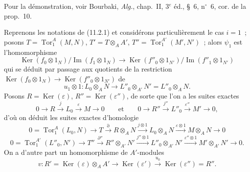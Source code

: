 Pour la démonstration, voir Bourbaki, \emph{Alg.}, chap.~II, 3$^e$ éd.,
\S~6, n$^\circ$~6, cor. de la prop.~10.

\begin{env}[11.2.3]
\label{IV.11.2.3-fr}
Reprenons les notations de (11.2.1) et considérons particulièrement le cas
$i=1$~; posons $T=\operatorname{Tor}_1^A(M,N)$, $T'=T\otimes_AA'$,
$T''=\operatorname{Tor}_1^{A'}(M',N')$~; alors $\psi_1$ est
l'homomorphisme
\[
\operatorname{Ker}(f_0\otimes1_N)/\operatorname{Im}(f_1\otimes1_N)
\to
\operatorname{Ker}(f''_0\otimes1_{N'})/
\operatorname{Im}(f''_1\otimes1_{N'})
\]
qui se déduit par passage aux quotients de la restriction
$\operatorname{Ker}(f_0\otimes1_N)\to
\operatorname{Ker}(f''_0\otimes1_{N'})$ de
\[
u_1\otimes1:L_0\otimes_AN\to L''_0\otimes_{A'}N'=L''_0\otimes_AN.
\]
Posons $R=\operatorname{Ker}(\varepsilon)$,
$R''=\operatorname{Ker}(\varepsilon'')$, de sorte que l'on a les suites
exactes
\[
0\to R\xrightarrow{j}L_0\xrightarrow{\varepsilon}M\to0
\qquad\text{et}\qquad
0\to R''\xrightarrow{j''}L''_0\xrightarrow{\varepsilon''}M'\to0,
\]
d'où on déduit les suites exactes d'homologie
\begin{equation}
0=\operatorname{Tor}_1^A(L_0,N)\to T\xrightarrow{\partial}R\otimes_AN
\xrightarrow{j\otimes1}L_0\otimes_AN\xrightarrow{\varepsilon\otimes1}
M\otimes_AN\to0
\label{IV.11.2.3.1-fr}
\tag{11.2.3.1}
\end{equation}
\begin{equation}
0=\operatorname{Tor}_1^{A'}(L''_0,N')\to T''\xrightarrow{\partial''}
R''\otimes_{A'}N'\xrightarrow{j''\otimes1}L''_0\otimes_{A'}N'
\xrightarrow{\varepsilon''\otimes1}M'\otimes_{A'}N'\to0.
\label{IV.11.2.3.2-fr}
\tag{11.2.3.2}
\end{equation}
On a d'autre part un homomorphisme de $A'$-modules
\[
v:R'=\operatorname{Ker}(\varepsilon)\otimes_AA'
\to\operatorname{Ker}(\varepsilon')\xrightarrow{u_0}
\operatorname{Ker}(\varepsilon'')=R''.
\]
\end{env}


